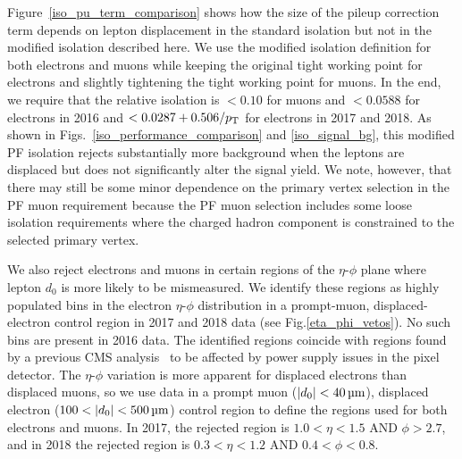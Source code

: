 Figure~\ref{iso_pu_term_comparison} shows how the size of the pileup correction term depends on lepton displacement in the standard isolation but not in the modified isolation described here. We use the modified isolation definition for both electrons and muons while keeping the original tight working point for electrons and slightly tightening the tight working point for muons. In the end, we require that the relative isolation is $<0.10$ for muons and $<0.0588$ for electrons in 2016 and $<0.0287+0.506/p_{\mathrm{T}}$ for electrons in 2017 and 2018. As shown in Figs.~\ref{iso_performance_comparison} and \ref{iso_signal_bg}, this modified PF isolation rejects substantially more background when the leptons are displaced but does not significantly alter the signal yield. We note, however, that there may still be some minor dependence on the primary vertex selection in the PF muon requirement because the PF muon selection includes some loose isolation requirements where the charged hadron component is constrained to the selected primary vertex.



We also reject electrons and muons in certain regions of the $\eta$-$\phi$ plane where lepton $d_0$ is more likely to be mismeasured. We identify these regions as highly populated bins in the electron $\eta$-$\phi$ distribution in a prompt-muon, displaced-electron control region in 2017 and 2018 data (see Fig.\ref{eta_phi_vetos}). No such bins are present in 2016 data. The identified regions coincide with regions found by a previous CMS analysis~\cite{disappearing_tracks} to be affected by power supply issues in the pixel detector. The $\eta$-$\phi$ variation is more apparent for displaced electrons than displaced muons, so we use data in a prompt muon ($\ad<\SI{40}{\um}$), displaced electron ($\num{100}<\ad<\SI{500}{\um}$) control region to define the  regions used for both electrons and muons. In 2017, the rejected region is $1.0<\eta<1.5$ AND $\phi>2.7$, and in 2018 the rejected region is $0.3<\eta<1.2$ AND $0.4<\phi<0.8$.




